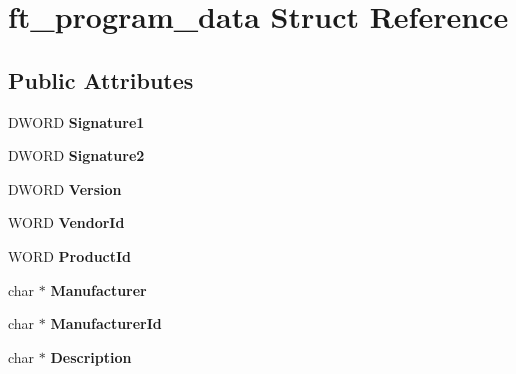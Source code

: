 \hypertarget{structft__program__data}{}\section{ft\+\_\+program\+\_\+data Struct Reference}
\label{structft__program__data}
\subsection*{Public Attributes}
\begin{DoxyCompactItemize}
\item 
\mbox{\label{structft__program__data_a6b26e04c691ec5944d2fffec797c399a}} 
D\+W\+O\+RD {\bfseries Signature1}
\item 
\mbox{\label{structft__program__data_ab28a0f4509093050f1927f1e946f3d9f}} 
D\+W\+O\+RD {\bfseries Signature2}
\item 
\mbox{\label{structft__program__data_a9ef2eb59fe9ef1699df92a9d50ac3a81}} 
D\+W\+O\+RD {\bfseries Version}
\item 
\mbox{\label{structft__program__data_a4d4e65a934b3a822d90d2b2fc461cb11}} 
W\+O\+RD {\bfseries Vendor\+Id}
\item 
\mbox{\label{structft__program__data_a623b7980fadab4322ed41da598b45397}} 
W\+O\+RD {\bfseries Product\+Id}
\item 
\mbox{\label{structft__program__data_a803860e98c4c7be38685b9c69e4684a5}} 
char $\ast$ {\bfseries Manufacturer}
\item 
\mbox{\label{structft__program__data_a2e84082e1e7b7c8e117c19a536813da5}} 
char $\ast$ {\bfseries Manufacturer\+Id}
\item 
\mbox{\label{structft__program__data_a254c31fdadcc3ce3748f6682083874a8}} 
char $\ast$ {\bfseries Description}
\item 
\mbox{\label{structft__program__data_a81ddee025aa0fa0b48189fb0ee7c5b46}} 

\end{DoxyCompactItemize}
